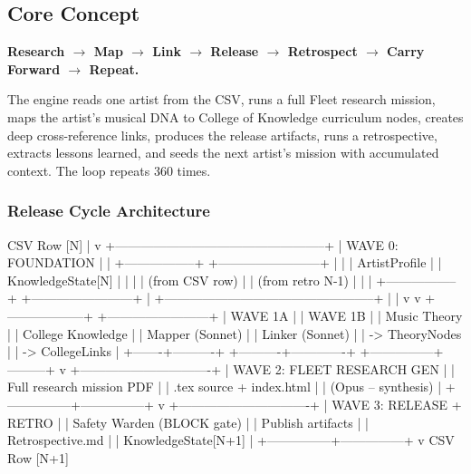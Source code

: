 \documentclass[11pt,letterpaper]{article}
\begin{document}
\subsection{Core Concept}

\textbf{Research $\rightarrow$ Map $\rightarrow$ Link $\rightarrow$ Release $\rightarrow$ Retrospect $\rightarrow$ Carry Forward $\rightarrow$ Repeat.}

The engine reads one artist from the CSV, runs a full Fleet research mission, maps the
artist's musical DNA to College of Knowledge curriculum nodes, creates deep cross-reference
links, produces the release artifacts, runs a retrospective, extracts lessons learned, and
seeds the next artist's mission with accumulated context. The loop repeats 360 times.

\subsubsection{Release Cycle Architecture}

\begin{asciibox}
CSV Row [N]
    |
    v
+--------------------------------------------------+
| WAVE 0: FOUNDATION                               |
| +-----------------+  +------------------------+  |
| | ArtistProfile   |  | KnowledgeState[N]      |  |
| | (from CSV row)  |  | (from retro N-1)       |  |
| +-----------------+  +------------------------+  |
+--------------------------------------------------+
    |                          |
    v                          v
+------------------+   +------------------------+
| WAVE 1A          |   | WAVE 1B                |
| Music Theory     |   | College Knowledge      |
| Mapper (Sonnet)  |   | Linker (Sonnet)        |
| -> TheoryNodes   |   | -> CollegeLinks        |
+-------+----------+   +----------+-------------+
        +---------------+---------+
                        v
        +-------------------------------+
        | WAVE 2: FLEET RESEARCH GEN    |
        | Full research mission PDF     |
        | .tex source + index.html      |
        | (Opus -- synthesis)           |
        +---------------+---------------+
                        v
        +-------------------------------+
        | WAVE 3: RELEASE + RETRO       |
        | Safety Warden (BLOCK gate)    |
        | Publish artifacts             |
        | Retrospective.md              |
        | KnowledgeState[N+1]           |
        +---------------+---------------+
                        v
                  CSV Row [N+1]
\end{asciibox}
\end{document}
